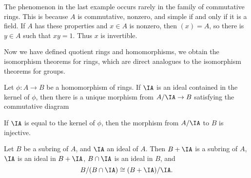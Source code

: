 The phenomenon in the last example occurs rarely in the family of commutative rings. This is because $A$ is commutative, nonzero, and simple if and only if it is a field. If $A$ has these properties and $x \in A$ is nonzero, then $(x) = A$, so there is $y \in A$ such that $xy = 1$. Thus $x$ is invertible.


Now we have defined quotient rings and homomorphisms, we obtain the isomorphism theorems for rings, which are direct analogues to the isomorphism theorems for groups.

\begin{theorem}
    Let $\phi: A \to B$ be a homomorphism of rings. If $\IA$ is an ideal contained in the kernel of $\phi$, then there is a unique morphism from $A/\IA \to B$ satisfying the commutative diagram
    \begin{center}
    \end{center}
    If $\IA$ is equal to the kernel of $\phi$, then the morphism from $A/\IA$ to $B$ is injective.
\end{theorem}

\begin{theorem}
    Let $B$ be a subring of $A$, and $\IA$ an ideal of $A$. Then $B + \IA$ is a subring of $A$, $\IA$ is an ideal in $B + \IA$, $B \cap \IA$ is an ideal in $B$, and
    \[ B/(B \cap \IA) \cong (B + \IA)/\IA. \]
\end{theorem}

